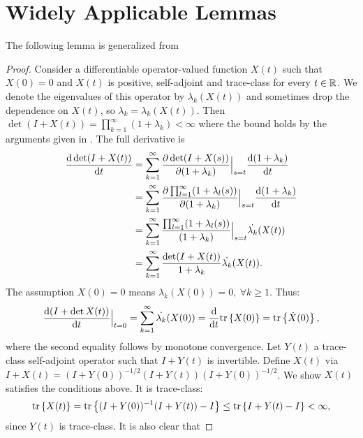 \documentclass{amsart}
\numberwithin{equation}{section}
\begin{document}
\appendix
\section{Widely Applicable Lemmas}

The following lemma is generalized from \cite[Chapter 9,
  Theorem 4, pp. 127]{Lax97}
\lax
\begin{proof}
  Consider a differentiable operator-valued function $X(t)$ such that
  $X(0) = 0$ and $X(t)$ is positive, self-adjoint and trace-class for
  every $t\in \mathbb{R}$. We denote the eigenvalues of this operator by
  $\lambda_k(X(t))$ and sometimes drop the dependence on $X(t)$, so
  $\lambda_k = \lambda_k(X(t))$.  Then $\det (I+X(t)) =
  \prod_{k=1}^{\infty} (1+\lambda_k) < \infty$ where the bound holds
  by the arguments given in \cite{AlexanderianGloorGhattas14}. The
  full derivative is
  \begin{align*}
    \frac{\text{\textup{d}} \det (I+X(t))}{\text{\textup{d}} t} 
    &= \sum_{k=1}^{\infty} 
    \frac{\partial \det (I+X(s))}{\partial (1+\lambda_k)}\Big |_{s=t}
    \frac{\text{\textup{d}} (1+\lambda_k)}{\text{\textup{d}} t} \\
    &= \sum_{k=1}^{\infty} \frac{\partial \prod_{l=1}^{\infty}
      (1+\lambda_l(s))}{\partial (1+\lambda_k)}\Big |_{s=t}
    \frac{\text{\textup{d}} (1+\lambda_k)}{\text{\textup{d}} t} \\
    &= \sum_{k=1}^{\infty} \frac{\prod_{l=1}^{\infty}
      (1+\lambda_l(s))}{(1+\lambda_k)}\Big |_{s=t}
    \dot{\lambda_k}(X(t)) \\
    &= \sum_{k=1}^{\infty} \frac{\det (I+X(t))}{1 +\lambda_k} \dot{\lambda_k}(X(t)).
  \end{align*}
  The assumption $X(0) = 0$ means $\lambda_k(X(0)) = 0,\ \forall k \geq 1$. Thus:
  \begin{align*}
    \frac{\text{\textup{d}} (I+\det X(t))}{\text{\textup{d}} t}\Big |_{t=0} 
    = \sum_{k=1}^{\infty} \dot{\lambda_k}(X(0)) 
    = \frac{\text{\textup{d}} }{\text{\textup{d}} t}\textup{tr}\left \{X(0) \right \}
    = \textup{tr}\left \{\dot{X}(0) \right \},
  \end{align*}
  where the second equality follows by monotone convergence. 
  Let $Y(t)$ a trace-class self-adjoint operator such that 
  $I+Y(t)$ is invertible.
  Define $X(t)$ via $I+X(t) = (I+Y(0))^{-1/2} (I+Y(t)) (I+Y(0))^{-1/2}$. 
  We show $X(t)$ satisfies the conditions above. It is trace-class:
  \begin{align*}
    \textup{tr}\left \{X(t) \right \} = \textup{tr}\left \{(I+Y(0))^{-1} (I+Y(t)) - I \right \}
    \leq \textup{tr}\left \{I+Y(t) - I \right \}< \infty,
  \end{align*}
  since $Y(t)$ is trace-class. It is also clear that

\end{proof}
\end{document}
